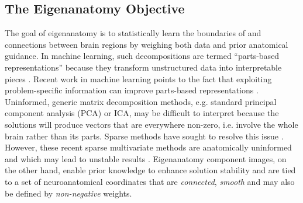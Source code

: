 \documentclass{elsarticle}\usepackage{graphicx, color}
\begin{document}
\subsection{The Eigenanatomy Objective} 
The goal of eigenanatomy is to statistically learn the boundaries of and connections between brain regions by weighing both data and prior anatomical guidance.  In machine learning, such decompositions are termed ``parts-based representations'' because they transform unstructured data into interpretable pieces \cite{Lee1999,sparseNMF_hoyer}.  Recent work in machine learning points to the fact that exploiting problem-specific information can improve parts-based representations \cite{Guan2011,Cai2010,Hosoda2009}.  Uninformed, generic matrix decomposition methods, e.g. standard principal component analysis (PCA) or ICA, may be difficult to interpret because the solutions will produce vectors that are everywhere non-zero, i.e. involve the whole brain rather than its parts.  Sparse methods have sought to resolve this issue \cite{sparseNMF_hoyer,Witten2010,Friedman2010,Cherkassky2009,Friedman2008}.  However, these recent sparse multivariate methods are anatomically uninformed {and which may lead to unstable results} \cite{Xu2011}. Eigenanatomy component images, on the other hand, {enable prior knowledge to enhance solution stability} and are tied to a set of neuroanatomical coordinates that are {\em connected}, {\em smooth} and may also be defined by {\em non-negative} weights. 


\end{document}
